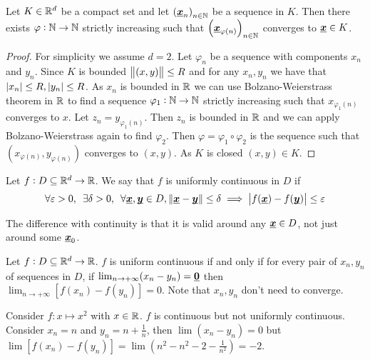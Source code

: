 \documentclass[12pt]{extarticle}
\renewcommand{\vec}[1]{\uvec{#1}}
\begin{document}
\begin{theorem}
    Let $K \in \mathbb{R}^d$ be a compact set and let $\left(\vec x_n\right)_{n \in \N}$ be a sequence in $K$.
    Then there exists $\varphi: \mathbb{N} \to \mathbb{N}$ strictly increasing such that $\left(\vec x_{\varphi(n)}\right)_{n \in \N}$ converges to $\vec x \in K$.
\end{theorem}

\begin{proof}
    For simplicity we assume $d = 2$. Let $\varphi_n$ be a sequence with components $x_n$ and $y_n$.
    Since $K$ is bounded $\norm{(x, y)} \leq R$ and for any $x_n, y_n$ we have that $\abs{x_n} \leq R, \abs{y_n} \leq R$.
    As $x_n$ is bounded in $\mathbb{R}$ we can use Bolzano-Weierstrass theorem in $\mathbb{R}$ to find a sequence $\varphi_1 : \mathbb{N} \to \mathbb{N}$ strictly increasing such that $x_{\varphi_1(n)}$ converges to $x$.
    Let $z_n = y_{\varphi_1(n)}$. Then $z_n$ is bounded in $\mathbb{R}$ and we can apply Bolzano-Weierstrass again to find $\varphi_2$.
    Then $\varphi = \varphi_1 \circ \varphi_2$ is the sequence such that $(x_{\varphi(n)}, y_{\varphi(n)})$ converges to $(x, y)$.
    As $K$ is closed $(x, y) \in K$.
\end{proof}

\begin{definition}
    Let $f: D \subseteq \mathbb{R}^d \to \mathbb{R}$. We say that $f$ is uniformly continuous in $D$ if
    \begin{equation}
        \forall \varepsilon > 0, \enspace \exists \delta > 0, \enspace \forall \vec x, \vec y \in D, \norm{\vec x - \vec y} \leq \delta \implies \abs{f(\vec x) - f(\vec y)} \leq \varepsilon
    \end{equation}

    The difference with  continuity is that it is valid around any $\vec x \in D$, not just around some $\vec x_0$.
\end{definition}

\begin{proposition}
    Let $f: D \subseteq \mathbb{R}^d \to \mathbb{R}$. $f$ is uniform continuous if and only if for every pair of $x_n, y_n$ of sequences in $D$, if $\lim_{n \to + \infty} (x_n - y_n) = \vec 0$ then $\lim_{n \to +\infty} [f(x_n) - f(y_n)] = 0$.
    Note that $x_n, y_n$ don't need to converge.
\end{proposition}

\begin{example}
    Consider $f: x \mapsto x^2$ with $x \in \mathbb{R}$. $f$ is continuous but not uniformly continuous.
    Consider $x_n = n$ and $y_n = n + \frac{1}{n}$, then $\lim (x_n - y_n) = 0$ but $\lim [f(x_n) - f(y_n)] = \lim (n^2 - n^2 - 2 - \frac{1}{n^2}) = -2$.
\end{example}
\end{document}
